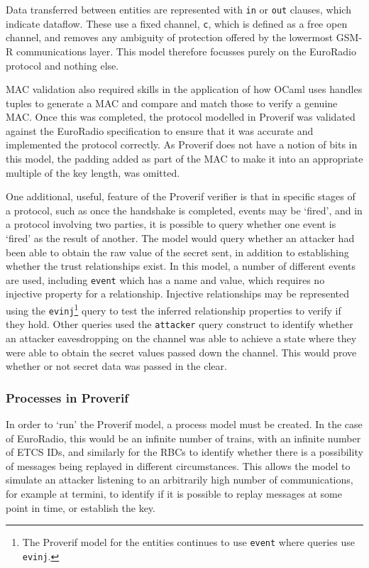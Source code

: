 \documentclass[twoside,11pt,a4paper]{article}
\begin{document}
Data transferred between entities are represented with \texttt{in} or \texttt{out} clauses, which indicate dataflow. These use a fixed channel, \texttt{c}, which is defined as a free open channel, and removes any ambiguity of protection offered by the lowermost GSM-R communications layer. This model therefore focusses purely on the EuroRadio protocol and nothing else.

MAC validation also required skills in the application of how OCaml uses handles tuples to generate a MAC and compare and match those to verify a genuine MAC. Once this was completed, the protocol modelled in Proverif was validated against the EuroRadio specification to ensure that it was accurate and implemented the protocol correctly. As Proverif does not have a notion of bits in this model, the padding added as part of the MAC to make it into an appropriate multiple of the key length, was omitted.

One additional, useful, feature of the Proverif verifier is that in specific stages of a protocol, such as once the handshake is completed, events may be `fired', and in a protocol involving two parties, it is possible to query whether one event is `fired' as the result of another. The model would query whether an attacker had been able to obtain the raw value of the secret sent, in addition to establishing whether the trust relationships exist. In this model, a number of different events are used, including \texttt{event} which has a name and value, which requires no injective property for a relationship. Injective relationships may be represented using the \texttt{evinj}\footnote{The Proverif model for the entities continues to use \texttt{event} where queries use \texttt{evinj}.} query to test the inferred relationship properties to verify if they hold. Other queries used the \texttt{attacker} query construct to identify whether an attacker eavesdropping on the channel was able to achieve a state where they were able to obtain the secret values passed down the channel. This would prove whether or not secret data was passed in the clear.

\subsubsection{Processes in Proverif}
In order to `run' the Proverif model, a process model must be created. In the case of EuroRadio, this would be an infinite number of trains, with an infinite number of ETCS IDs, and similarly for the RBCs to identify whether there is a possibility of messages being replayed in different circumstances. This allows the model to simulate an attacker listening to an arbitrarily high number of communications, for example at termini, to identify if it is possible to replay messages at some point in time, or establish the key.
\end{document}
